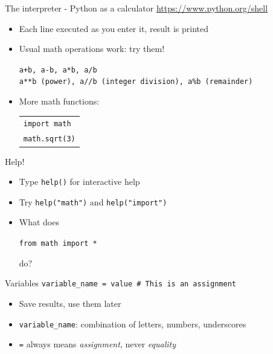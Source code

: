 \documentclass[11pt]{beamer}
\begin{document}
\begin{frame}{The interpreter - Python as a calculator}
  \url{https://www.python.org/shell}

  \vspace{0.3cm}
  \begin{itemize}
    \item Each line executed as you enter it, result is printed
    \item Usual math operations work: try them!
      \begin{center}
        \texttt{a+b, a-b, a*b, a/b}\\
        \texttt{a**b (power), a//b (integer division), a\%b (remainder)}
      \end{center}
    \item More math functions:
      \begin{center} \begin{tabular}{l}
        \texttt{import math} \\
        \texttt{math.sqrt(3)}
      \end{tabular} \end{center}
  \end{itemize}
\end{frame}


\begin{frame}{Help!}
  \begin{itemize}
    \item Type \texttt{help()} for interactive help
    \item Try \texttt{help("math")} and \texttt{help("import")}
    \item What does
      \begin{center} \texttt{from math import *} \end{center}
    do?
  \end{itemize}
\end{frame}

\begin{frame}{Variables}
  \texttt{variable\_name = value \qquad \# This is an assignment}

  \vspace{0.3cm}
  \begin{itemize}
    \item Save results, use them later
    \item \texttt{variable\_name}: combination of letters, numbers, underscores
    \item \texttt{=} always means \emph{assignment}, never \emph{equality}
  \end{itemize}
\end{frame}
\end{document}
